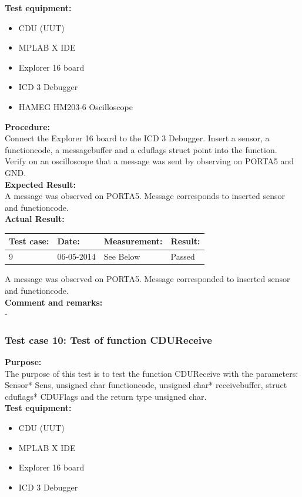 \textbf{Test equipment:}
\begin{itemize}
\item CDU (UUT)
\item MPLAB X IDE
\item Explorer 16 board
\item ICD 3 Debugger
\item HAMEG HM203-6 Oscilloscope
\end{itemize}

\textbf{Procedure:}\\
Connect the Explorer 16 board to the ICD 3 Debugger. Insert a sensor, a functioncode, a messagebuffer and a cduflags struct point into the function. Verify on an oscilloscope that a message was sent by observing on PORTA5 and GND.\\

\textbf{Expected Result:}\\
A message was observed on PORTA5. Message corresponds to inserted sensor and functioncode.\\

\textbf{Actual Result:}\\
\begin{table}[H]
\centering
\begin{tabular}{|p{2cm}|p{2cm}|p{3cm}|p{2cm}|}\hline
\textbf{Test case:} & \textbf{Date:} & \textbf{Measurement:} & \textbf{Result:} \\ \hline
9 & 06-05-2014 & See Below & Passed \\ \hline
\end{tabular}
\end{table}
A message was observed on PORTA5. Message corresponded to inserted sensor and functioncode.\\

\textbf{Comment and remarks:}\\
-\\

\subsubsection{Test case 10: Test of function CDUReceive }
\textbf{Purpose:}\\
The purpose of this test is to test the function CDUReceive with the parameters: Sensor* Sens, unsigned char functioncode, unsigned char* receivebuffer, struct cduflags* CDUFlags and the return type unsigned char.\\

\textbf{Test equipment:}
\begin{itemize}
\item CDU (UUT)
\item MPLAB X IDE
\item Explorer 16 board
\item ICD 3 Debugger
\end{itemize}

